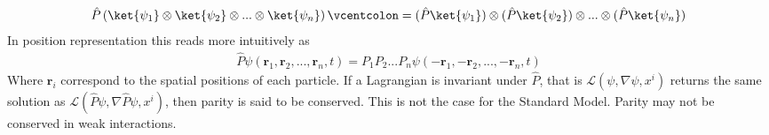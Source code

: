 \begin{align*}
\hat{P}\left(\ket{\psi_1}\otimes\ket{\psi_2}\otimes...\otimes\ket{\psi_n}\right) \vcentcolon= (\hat{P}\ket{\psi_1})\otimes(\hat{P}\ket{\psi_2})\otimes...\otimes(\hat{P}\ket{\psi_n})
\end{align*}
In position representation this reads more intuitively as
\begin{align*}
\hat{P}\psi(\mathbf{r}_1,\mathbf{r}_2,...,\mathbf{r}_n,t)=P_1P_2...P_n\psi(-\mathbf{r}_1,-\mathbf{r}_2,...,-\mathbf{r}_n,t)
\end{align*}
Where $\mathbf{r}_i$ correspond to the spatial positions of each particle. If a Lagrangian is invariant under $\hat{P}$, that is $\mathcal{L}(\psi,\nabla \psi,x^i)$ returns the same solution as $\mathcal{L}(\hat{P}\psi,\nabla \hat{P}\psi,x^i)$, then parity is said to be conserved. This is not the case for the Standard Model. Parity may not be conserved in weak interactions.

